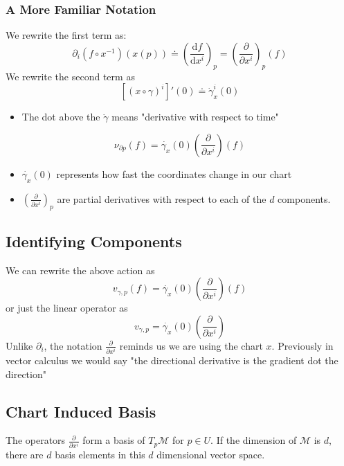 \documentclass[10pt]{article}
\begin{document}
\subsubsection*{A More Familiar Notation}
We rewrite the first term as:
\[\partial_i(f \circ x^{-1})(x(p)) \doteq \left(\frac{\text{d}f}{\text{d}x^i}\right)_p = \left(\frac{\partial}{\partial x^i}\right)_p(f)\]
We rewrite the second term as
\[[(x \circ \gamma)^i]'(0) \doteq \dot{\gamma}_x^i(0)\]
\begin{itemize}
    \item The dot above the $\dot{\gamma}$ means "derivative with respect to time"
\end{itemize}
\[\nu_{\partial p} (f) = \dot{\gamma_x} (0) \left(\frac{\partial}{\partial x^i}\right) (f)\]
\begin{itemize}
    \item $\dot{\gamma_x}(0)$ represents how fast the coordinates change in our chart
    \item $\left(\frac{\partial}{\partial x^i}\right)_p$ are partial derivatives with respect to each of the $d$ components.
\end{itemize}

\subsection*{Identifying Components}
We can rewrite the above action as
\[v_{\gamma, p}(f) = \dot{\gamma_x}(0) \left(\frac{\partial}{\partial x^i}\right)(f)\]
or just the linear operator as
\[v_{\gamma, p} = \dot{\gamma_x}(0) \left(\frac{\partial}{\partial x^i}\right)\]
Unlike $\partial_i$, the notation $\frac{\partial}{\partial x^i}$ reminds us we are using the chart $x$.  Previously in vector calculus we would say "the directional derivative is the gradient dot the direction"

\subsection*{Chart Induced Basis}
The operators $\frac{\partial}{\partial x^i}$ form a basis of $T_p \mathcal{M}$ for $p \in U$.  If the dimension of $\mathcal{M}$ is $d$, there are $d$ basis elements in this $d$ dimensional vector space.
\end{document}
